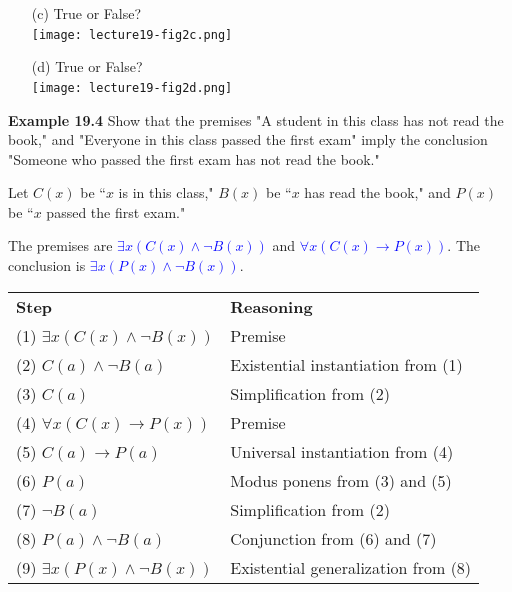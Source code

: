 \documentclass[aspectratio=169]{beamer}
\providecommand{\Blue}[1]{\textcolor{blue}{#1}}
\begin{document}
 \begin{frame}[plain]{}

    \begin{itemize}
     \item[(c)]  True or False? \\
      \texttt{[image: lecture19-fig2c.png]}\ 
    \item[(d)]  True or False? \\
     \texttt{[image: lecture19-fig2d.png]}\ 
    \end{itemize}
 
 \end{frame}
 


\begin{frame}[plain]{}

  {\bf Example 19.4}  Show that the premises 
   "A student in this class has not read the book," and 
   "Everyone in this class passed the first exam" imply the conclusion 
   "Someone who passed the first exam has not read the book."
   \medskip
    \pause
    
    Let $C(x)$ be ``$x$ is in this class," $B(x)$ be ``$x$ has read the book,"
     and $P(x)$ be ``$x$ passed the first exam."\\
     \smallskip
     
    The premises are \Blue{$\exists x (C(x)\wedge \lnot B(x))$} and
    \Blue{$\forall x (C(x)\rightarrow P(x))$}. The conclusion is 
    \Blue{$\exists x (P(x)\wedge \lnot B(x))$}.
     
   \begin{center}
      \begin{tabular}{ll}
        {\bf Step}   & {\bf Reasoning} \\ \pause 
        (1) $\exists x (C(x)\wedge \lnot B(x))$ & Premise \\ \pause
        (2) $C(a)\wedge \lnot B(a)$  & Existential instantiation from (1)\\ \pause 
        (3)  $C(a)$ & Simplification from (2)\\ \pause 
        (4) $\forall x (C(x)\rightarrow P(x))$  & Premise\\ \pause 
        (5) $C(a)\rightarrow P(a)$ & Universal instantiation from (4)\\ \pause
        (6) $P(a)$  & Modus ponens from (3) and (5) \\ \pause
        (7) $\lnot B(a)$  & Simplification from (2) \\ \pause
        (8) $P(a)\wedge \lnot B(a)$ & Conjunction from (6) and (7) \\ \pause
        (9) $\exists x (P(x)\wedge \lnot B(x))$ & Existential generalization from (8)
     \end{tabular}
     \end{center}
  
\end{frame}
\end{document}
